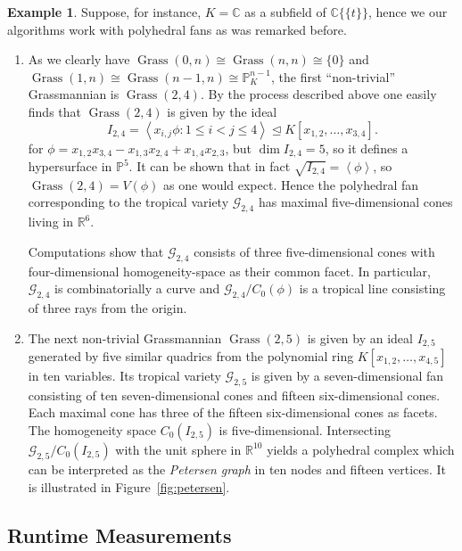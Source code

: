 \documentclass[
  paper=a4,
  titlepage,
  bibliography=totoc,
  pagesize=pdftex
]{scrartcl}
\numberwithin{figure}{section}
\numberwithin{equation}{section}
\numberwithin{table}{section}
\newcommand*\setR{\mathds{R}}
\newcommand*\setC{\mathds{C}}
\newcommand*\setP{\mathds{P}}
\newcommand*\ideal[1]{\left\langle #1 \right\rangle}
\newcommand*\puiseux[2]{#1\{\!\{#2\}\!\}}
\newcommand*\CCt{\puiseux{\setC}{t}}
\let\idealof\trianglelefteq
\DeclareMathOperator{\Grass}{Grass}
\theoremstyle{definition}
\newtheorem{example}[definition]{Example}
\numberwithin{definition}{section}
\begin{document}
\begin{example} \label{ex:tropGrass}
  Suppose, for instance, $K = \setC$ as a subfield of $\CCt$, hence we our algorithms work
  with polyhedral fans as was remarked before.
  \begin{enumerate}
    \item As we clearly have $\Grass(0,n) \cong \Grass(n,n) \cong \{0\}$ and $\Grass(1,n)
      \cong \Grass(n-1, n) \cong \setP_K^{n-1}$, the first \enquote{non-trivial}
      Grassmannian is $\Grass(2,4)$. By the process described above one easily finds that
      $\Grass(2,4)$ is given by the ideal
      \[
        I_{2,4} = \ideal{ x_{i,j} \phi : 1 \leq i < j \leq 4 }
        \idealof K[x_{1,2}, \dots, x_{3,4}].
      \]
      for $\phi = x_{1,2}x_{3,4} - x_{1,3}x_{2,4} + x_{1,4}x_{2,3}$, but $\dim I_{2,4} =
      5$, so it defines a hypersurface in $\setP^5$. It can be shown that in fact
      $\sqrt{I_{2,4}} = \ideal \phi$, so $\Grass(2,4) = V(\phi)$ as one would expect.
      Hence the polyhedral fan corresponding to the tropical variety $\mathcal G_{2,4}$
      has maximal five-dimensional cones living in $\setR^6$.

      Computations show that $\mathcal G_{2,4}$ consists of three five-dimensional cones
      with four-dimensional homogeneity-space as their common facet. In particular,
      $\mathcal G_{2,4}$ is combinatorially a curve and $\mathcal G_{2,4}/C_0(\phi)$ is a
      tropical line consisting of three rays from the origin.
    \item The next non-trivial Grassmannian $\Grass(2,5)$ is given by an ideal $I_{2,5}$
      generated by five similar quadrics from the polynomial ring $K[x_{1,2}, \dots,
      x_{4,5}]$ in ten variables. Its tropical variety $\mathcal G_{2,5}$ is given by a
      seven-dimensional fan consisting of ten seven-dimensional cones and fifteen
      six-dimensional cones. Each maximal cone has three of the fifteen six-dimensional
      cones as facets. The homogeneity space $C_0(I_{2,5})$ is five-dimensional.
      Intersecting $\mathcal G_{2,5}/C_0(I_{2,5})$ with the unit sphere in $\setR^{10}$
      yields a polyhedral complex which can be interpreted as the \emph{Petersen graph} in
      ten nodes and fifteen vertices. It is illustrated in Figure~\ref{fig:petersen}.
  \end{enumerate}
\end{example}

\subsection{Runtime Measurements}
\end{document}
